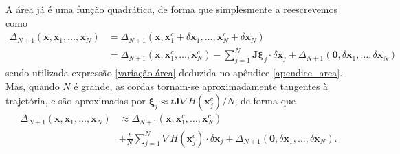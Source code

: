\documentclass[
	12pt,
	oneside,			%
	a4paper,			%
	english,			%
	brazil				%
	]{abntex2}
\theoremstyle{definition}
\begin{document}
A área já é uma função quadrática, de forma que simplesmente a reescrevemos como
\begin{equation}
    \begin{aligned}
        \Delta_{N+1}\left(\mathbf{x},\mathbf{x}_1,\ldots,\mathbf{x}_{N}\right) &=
        \Delta_{N+1}\left(\mathbf{x} ,\mathbf{x}_1^c+\delta\mathbf{x}_1,\ldots,\mathbf{x}_{N}^c+\delta\mathbf{x}_N\right) \\
    &=\Delta_{N+1}\left(\mathbf{x},\mathbf{x}_1^c,\ldots,\mathbf{x}_{N}^c\right) - \sum_{j=1}^N \mathbf{J} \boldsymbol{\xi}_j \cdot \delta\mathbf{x}_j  + \Delta_{N+1}\left(\boldsymbol{0},\delta\mathbf{x}_1,\ldots,\delta\mathbf{x}_N\right)
    \end{aligned}
\end{equation}
sendo utilizada expressão \eqref{variação área} deduzida no apêndice \ref{apendice_area}. Mas, quando $N$ é grande, as cordas tornam-se aproximadamente tangentes à trajetória, e são aproximadas por $\boldsymbol{\xi}_j \approx t \mathbf{J} \nabla H(\mathbf{x}_j^c)/N$, de forma que
\begin{equation}
    \begin{aligned}
        \Delta_{N+1}\left(\mathbf{x},\mathbf{x}_1,\ldots,\mathbf{x}_{N}\right) &\approx \Delta_{N+1}\left(\mathbf{x},\mathbf{x}_1^c,\ldots,\mathbf{x}_{N}^c\right) \\ &+ \frac{t}{N}\sum_{j=1}^N \nabla H(\mathbf{x}_j^c) \cdot \delta\mathbf{x}_j  + \Delta_{N+1}\left(\boldsymbol{0},\delta\mathbf{x}_1,\ldots,\delta\mathbf{x}_N\right).
    \end{aligned}
\end{equation}
\end{document}
